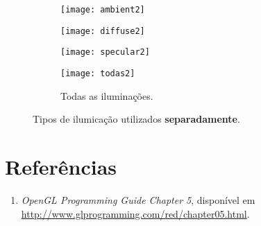 \documentclass[12pt, a4paper]{article}
\begin{document}
\FloatBarrier

\begin{figure}[h!]

\centering

\begin{subfigure}{.245\textwidth}
\centering
\texttt{[image: ambient2]}
\caption{\centering {}}
\label{img:ambient2}
\end{subfigure}%
\begin{subfigure}{.245\textwidth}
\centering
\texttt{[image: diffuse2]}
\caption{\centering {}}
\label{img:diffuse2}
\end{subfigure}
\begin{subfigure}{.245\textwidth}
\centering
\texttt{[image: specular2]}
\caption{\centering {}}
\label{img:specular2}
\end{subfigure}
\begin{subfigure}{.245\textwidth}
\centering
\texttt{[image: todas2]}
\caption{\centering Todas as iluminações.}
\label{img:all}
\end{subfigure}


\caption{Tipos de ilumicação utilizados \textbf{separadamente}.}
\end{figure}

\FloatBarrier

\section* {Referências}

\begin {enumerate}
  \item \textit{OpenGL Programming Guide Chapter 5}, disponível em
  \url{http://www.glprogramming.com/red/chapter05.html}.
\end{enumerate}
\end{document}
